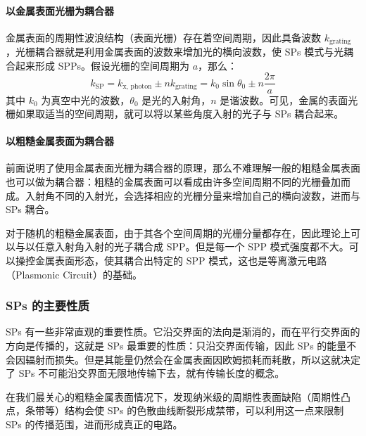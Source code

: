 \paragraph{以金属表面光栅为耦合器}
金属表面的周期性波浪结构（表面光栅）存在着空间周期，因此具备波数 $k_{\text{grating}}$，光栅耦合器就是利用金属表面的波数来增加光的横向波数，使 SPs 模式与光耦合起来形成 SPPs。假设光栅的空间周期为 $a$，那么\cite{Novotny:2012aa}：
\[
	k_{\text{SP}} = k_{\text{x, photon}} \pm nk_{\text{grating}} = k_0\sin\theta_0 \pm n\dfrac{2\pi}{a}
\]
其中 $k_0$ 为真空中光的波数，$\theta_0$ 是光的入射角，$n$ 是谐波数。可见，金属的表面光栅如果取适当的空间周期，就可以将以某些角度入射的光子与 SPs 耦合起来。

\paragraph{以粗糙金属表面为耦合器}
前面说明了使用金属表面光栅为耦合器的原理，那么不难理解一般的粗糙金属表面也可以做为耦合器：粗糙的金属表面可以看成由许多空间周期不同的光栅叠加而成。入射角不同的入射光，会选择相应的光栅分量来增加自己的横向波数，进而与 SPs 耦合。

对于随机的粗糙金属表面，由于其各个空间周期的光栅分量都存在，因此理论上可以与以任意入射角入射的光子耦合成 SPP。但是每一个 SPP 模式强度都不大。可以操控金属表面形态，使其耦合出特定的 SPP 模式，这也是等离激元电路（Plasmonic Circuit）的基础。

\subsubsection{SPs 的主要性质}
SPs 有一些非常直观的重要性质。它沿交界面的法向是渐消的，而在平行交界面的方向是传播的，这就是 SPs 最重要的性质：只沿交界面传输，因此 SPs 的能量不会因辐射而损失。但是其能量仍然会在金属表面因欧姆损耗而耗散，所以这就决定了 SPs 不可能沿交界面无限地传输下去，就有传输长度的概念。

在我们最关心的粗糙金属表面情况下，发现纳米级的周期性表面缺陷（周期性凸点，条带等）结构会使 SPs 的色散曲线断裂形成禁带，可以利用这一点来限制 SPs 的传播范围，进而形成真正的电路。

